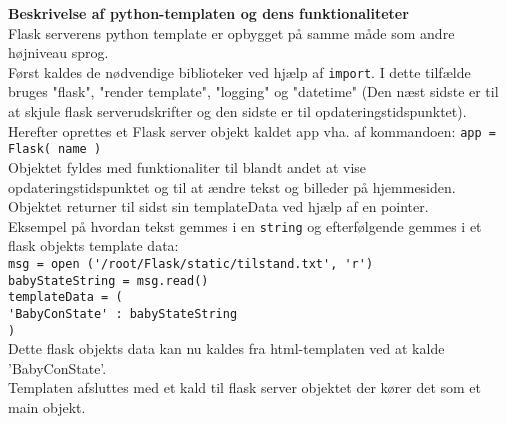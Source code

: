 \textbf{Beskrivelse af python-templaten og dens funktionaliteter}\\
Flask serverens python template er opbygget på samme måde som andre højniveau sprog. \\
Først kaldes de nødvendige biblioteker ved hjælp af \verb+import+. I dette tilfælde bruges "flask", "render template", "logging" og "datetime" (Den næst sidste er til at skjule flask serverudskrifter og den sidste er til opdateringstidspunktet). \\ 
Herefter oprettes et Flask server objekt kaldet app vha. af kommandoen: \verb+app = Flask( name )+ \\ 
Objektet fyldes med funktionaliter til blandt andet at vise opdateringstidspunktet og til at ændre tekst og billeder på hjemmesiden. Objektet returner til sidst sin templateData ved hjælp af en pointer. \\
Eksempel på hvordan tekst gemmes i en \verb+string+ og efterfølgende gemmes i et flask objekts template data: \\
 \verb+msg = open ('/root/Flask/static/tilstand.txt', 'r')+ \\
   \verb+babyStateString = msg.read()+ \\
   \verb+templateData = (+ \\
      \verb+'BabyConState' : babyStateString+\\
      \verb+)+ \\ Dette flask objekts data kan nu kaldes fra html-templaten ved at kalde 'BabyConState'. \\
Templaten afsluttes med et kald til flask server objektet der kører det som et main objekt. \\
\vspace{5mm}

